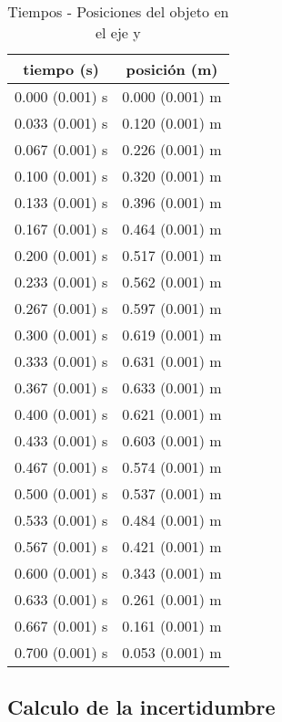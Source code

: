 \documentclass[12pt,a4paper]{article}
\begin{document}
\begin{table}[!h]
\begin{center}
\begin{tabular}{|c|c|}
\hline
tiempo (s) & posición (m) \\ \hline
0.000 (0.001) s & 0.000 (0.001) m \\ \hline
0.033 (0.001) s & 0.120 (0.001) m \\ \hline
0.067 (0.001) s & 0.226 (0.001) m \\ \hline
0.100 (0.001) s & 0.320 (0.001) m \\ \hline
0.133 (0.001) s & 0.396 (0.001) m \\ \hline
0.167 (0.001) s & 0.464 (0.001) m \\ \hline
0.200 (0.001) s & 0.517 (0.001) m \\ \hline
0.233 (0.001) s & 0.562 (0.001) m \\ \hline
0.267 (0.001) s & 0.597 (0.001) m \\ \hline
0.300 (0.001) s & 0.619 (0.001) m \\ \hline
0.333 (0.001) s & 0.631 (0.001) m \\ \hline
0.367 (0.001) s & 0.633 (0.001) m \\ \hline
0.400 (0.001) s & 0.621 (0.001) m \\ \hline
0.433 (0.001) s & 0.603 (0.001) m \\ \hline
0.467 (0.001) s & 0.574 (0.001) m \\ \hline
0.500 (0.001) s & 0.537 (0.001) m \\ \hline
0.533 (0.001) s & 0.484 (0.001) m \\ \hline
0.567 (0.001) s & 0.421 (0.001) m \\ \hline
0.600 (0.001) s & 0.343 (0.001) m \\ \hline
0.633 (0.001) s & 0.261 (0.001) m \\ \hline
0.667 (0.001) s & 0.161 (0.001) m \\ \hline
0.700 (0.001) s & 0.053 (0.001) m \\ \hline
\end{tabular}
\caption{Tiempos - Posiciones del objeto en el eje y}
\end{center}
\end{table}

\subsection{Calculo de la incertidumbre}
\end{document}
